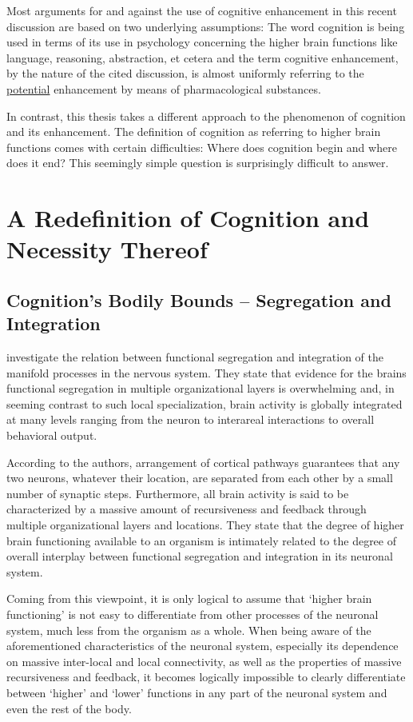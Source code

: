 Most arguments for and against the use of cognitive enhancement in this recent discussion are based on two underlying assumptions: The word cognition is being used in terms of its use in psychology concerning the higher brain functions like language, reasoning, abstraction, et cetera and the term cognitive enhancement, by the nature of the cited discussion, is almost uniformly referring to the \underline{potential} enhancement by means of pharmacological substances.

In contrast, this thesis takes a different approach to the phenomenon of cognition and its enhancement. The definition of cognition as referring to higher brain functions comes with certain difficulties: Where does cognition begin and where does it end? This seemingly simple question is surprisingly difficult to answer.

\section{A Redefinition of Cognition and Necessity Thereof}
\subsection{Cognition's Bodily Bounds -- Segregation and Integration}
\citet{Tononi1994} investigate the relation between functional segregation and integration of the manifold processes in the nervous system. They state that evidence for the brains functional segregation in multiple organizational layers is overwhelming and, in seeming contrast to such local specialization, brain activity is globally integrated at many levels ranging from the neuron to interareal interactions to overall behavioral output. 

According to the authors, arrangement of cortical pathways guarantees that any two neurons, whatever their location, are separated from each other by a small number of synaptic steps. Furthermore, all brain activity is said to be characterized by a massive amount of recursiveness and feedback through multiple organizational layers and locations. They state that the degree of higher brain functioning available to an organism is intimately related to the degree of overall interplay between functional segregation and integration in its neuronal system.

Coming from this viewpoint, it is only logical to assume that ‘higher brain functioning’ is not easy to differentiate from other processes of the neuronal system, much less from the organism as a whole. When being aware of the aforementioned characteristics of the neuronal system, especially its dependence on massive inter-local and local connectivity, as well as the properties of massive recursiveness and feedback, it becomes logically impossible to clearly differentiate between ‘higher’ and ‘lower’ functions in any part of the neuronal system and even the rest of the body.

